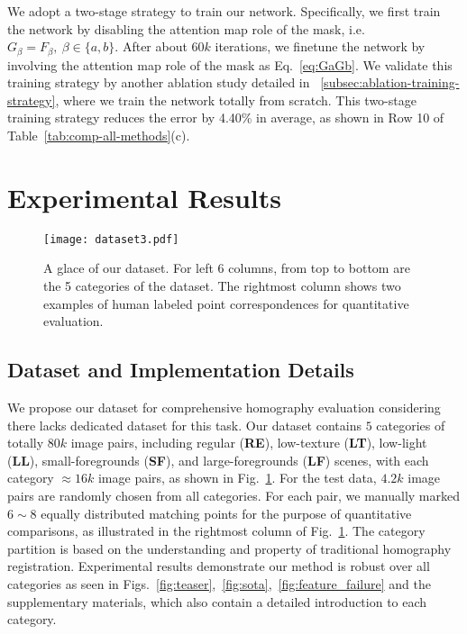 \documentclass[runningheads]{llncs}
\begin{document}
We adopt a two-stage strategy to train our network. Specifically, we first train the network by disabling the attention map role of the mask, i.e. $G_\beta = F_\beta,~\beta \in \{a,b\}$. After about $60k$ iterations, we finetune the network by involving the attention map role of the mask as Eq.~\ref{eq:GaGb}. We validate this training strategy by another ablation study detailed in \secname~\ref{subsec:ablation-training-strategy}, where we train the network totally from scratch. This two-stage training strategy reduces the error by 4.40\% in average, as shown in Row 10 of Table~\ref{tab:comp-all-methods}(c).
\section{Experimental Results}\label{sec:exp}

\begin{figure}[t]
  \centering
  \texttt{[image: dataset3.pdf]}\\
\caption{A glace of our dataset. For left 6 columns, from top to bottom are the 5 categories of the dataset. The rightmost column shows two examples of human labeled point correspondences for quantitative evaluation.}
  \label{fig:dataset}\end{figure}

\subsection{Dataset and Implementation Details}

We propose our dataset for comprehensive homography evaluation considering there lacks dedicated dataset for this task. Our dataset contains $5$ categories of totally $80k$ image pairs, including regular (\textbf{RE}), low-texture (\textbf{LT}), low-light (\textbf{LL}), small-foregrounds (\textbf{SF}), and large-foregrounds (\textbf{LF}) scenes, with each category $\approx16k$ image pairs, as shown in Fig.~\ref{fig:dataset}.
For the test data, $4.2k$ image pairs are randomly chosen from all categories. For each pair, we manually marked $6 \sim 8$ equally distributed matching points for the purpose of quantitative comparisons, as illustrated in the rightmost column of Fig.~\ref{fig:dataset}. {\color{black}The category partition is based on the understanding and property of traditional homography registration.} Experimental results demonstrate our method is robust over all categories as seen in Figs.~\ref{fig:teaser},~\ref{fig:sota},~\ref{fig:feature_failure} and the supplementary materials, which also contain a detailed introduction to each category. 
\end{document}
